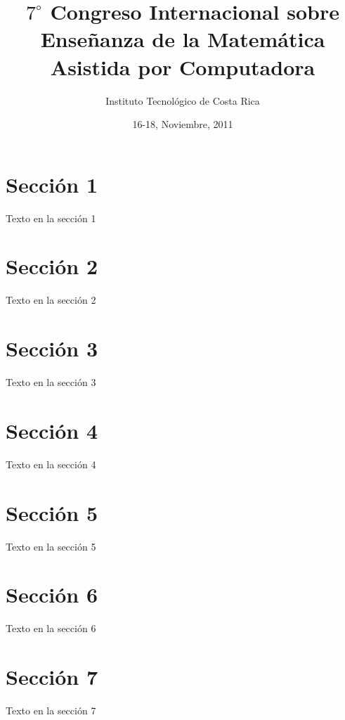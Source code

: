 \documentclass[10pt, notumble, letterpaper]{leaflet}
\title{$7^\circ$ Congreso Internacional sobre Enseñanza de la Matemática Asistida por Computadora}
\author{Instituto Tecnológico de Costa Rica}
\date{16-18, Noviembre, 2011 }
\begin{document}
\maketitle

\thispagestyle{empty}

\section{Sección 1} 

Texto en la sección 1

\newpage

\section{Sección 2} 

Texto en la sección 2

\newpage

\section{Sección 3} 

Texto en la sección 3

\newpage

\section{Sección 4} 

Texto en la sección 4

\newpage

\section{Sección 5} 

Texto en la sección 5

\newpage

\section{Sección 6} 

Texto en la sección 6

\section{Sección 7} 

Texto en la sección 7
\end{document}
